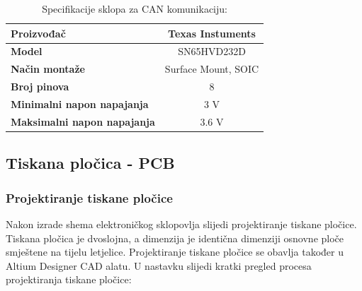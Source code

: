 \documentclass[11pt,a4paper]{article}
\begin{document}
\begin{table}[H]
	\centering
	\caption{Specifikacije sklopa za CAN komunikaciju: }
	\label{tab:specifikacija_CAN_bus}
	\begin{tabular}{|l|c|}
		\hline
		\textbf{Proizvođač} & Texas Instuments \\ \hline 
		\textbf{Model} &  SN65HVD232D \\ \hline 
		\textbf{Način montaže} & Surface Mount, SOIC \\ \hline 
		\textbf{Broj pinova} & 8 \\ \hline 
		\textbf{Minimalni napon napajanja} & 3 V \\ \hline 
		\textbf{Maksimalni napon napajanja} & 3.6 V    \\ \hline
	\end{tabular}
\end{table}

\subsection{Tiskana pločica - PCB}

\subsubsection{Projektiranje tiskane pločice}
Nakon izrade shema elektroničkog sklopovlja slijedi projektiranje tiskane pločice. Tiskana pločica je dvoslojna, a dimenzija je identična dimenziji osnovne ploče smještene na tijelu letjelice. Projektiranje tiskane pločice se obavlja također u Altium Designer CAD alatu. U nastavku slijedi kratki pregled procesa projektiranja tiskane pločice:
\end{document}
